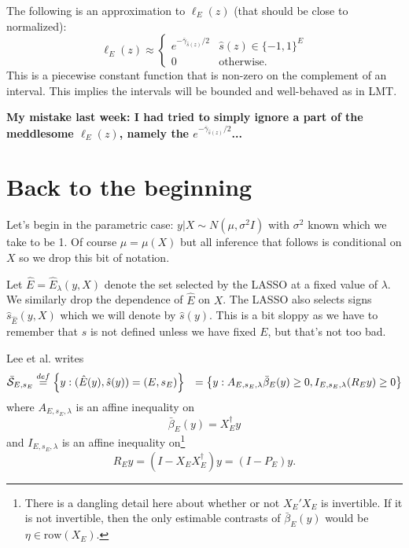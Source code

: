 \documentclass{article}
\newcommand{\OLS}{\bar{\beta}}
\begin{document}
        The following is an approximation to $\ell_E(z)$ (that should be close to normalized):
        \begin{equation}
          \label{eq:selective:RN}
        \ell_E(z) \approx \begin{cases}
          e^{-\bar{\gamma}_{\hat{s}(z)}/2} & \hat{s}(z) \in \{-1,1\}^E \\
          0 & \text{otherwise.}
          \end{cases}
        \end{equation}
        This is a piecewise constant function that  is
        non-zero on the complement of an interval. This implies the intervals will be
        bounded and well-behaved as in LMT.
        
        {\bf My mistake last week: I had tried to simply ignore a part of the meddlesome
          $\ell_E(z)$, namely the $e^{-\bar{\gamma}_{\hat{s}(z)}/2}$...}

        \section{Back to the beginning}

        Let's begin in the parametric case: $y|X \sim N(\mu, \sigma^2
        I)$ with $\sigma^2$ known which we take to be 1. Of course
        $\mu=\mu(X)$ but all inference that follows is conditional on
        $X$ so we drop this bit of notation.

        Let $\hat{E}=\hat{E}_{\lambda}(y,X)$ denote the set selected
        by the LASSO at a fixed value of $\lambda$. We similarly drop
        the dependence of $\hat{E}$ on $X$.  The LASSO also selects
        signs $\hat{s}_{\hat{E}}(y,X)$ which we will denote by
        $\hat{s}(y)$. This is a bit sloppy as we have to remember that
        $s$ is not defined unless we have fixed $E$, but that's not
        too bad.
        
        Lee et al. writes
        $$
        \begin{aligned}
        \bar{\cal S}_{E,s_E} &\overset{def}{=} \left\{y:
        (\hat{E}(y),\hat{s}(y))=(E, s_E)\right\} &= \left\{y:
        A_{E,s_E,\lambda}\OLS_E(y) \geq 0, I_{E,s_E,\lambda}(R_Ey) \geq 0 \right\}
        \end{aligned}
        $$ where $A_{E,s_E,\lambda}$ is an affine inequality on
        $$ \OLS_E(y) = X_E^{\dagger}y
        $$ and $I_{E,s_E,\lambda}$ is an affine inequality on\footnote{There is a dangling
        detail here about whether or not $X_E'X_E$ is invertible. If it is not invertible,
        then the only estimable contrasts of $\OLS_E(y)$ would be $\eta \in \text{row}(X_E)$.}
        $$ R_Ey = (I - X_EX_E^{\dagger})y=(I-P_E)y.
        $$
\end{document}
